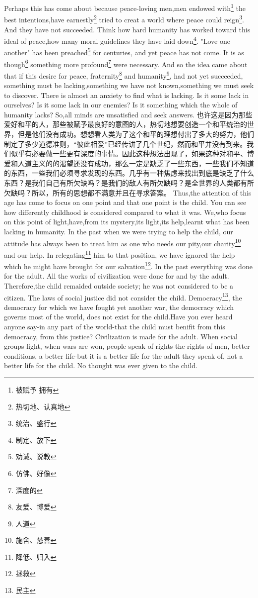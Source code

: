 \documentclass[lang=cn,10pt]{elegantbook}
\begin{document}
Perhaps this has come about because peace-loving men,men endowed with\footnote{被赋予 拥有} the best intentions,have earnestly\footnote{热切地、认真地} tried to creat a world where peace could reign\footnote{统治、盛行}. And they have not succeeded. Think how hard humanity has worked toward this ideal of peace,how many moral guidelines they have laid down\footnote{制定、放下}. "Love one another" has been preached\footnote{劝诫、说教} for centuries, and yet peace has not come. It is as though\footnote{仿佛、好像} something more profound\footnote{深度的} were necessary. And so the idea came about that if this desire for peace, fraternity\footnote{友爱、博爱} and humanity\footnote{人道}, had not yet succeeded, something must be lacking,something we have not known,something we must seek to discover. There is almost an anxiety to find what is lacking. Is it some lack in ourselves? Is it some lack in our enemies? Is it something which the whole of humanity lacks? So,all minds are unsatisfied and seek answers.
也许这是因为那些爱好和平的人，那些被赋予最良好的意图的人，热切地想要创造一个和平统治的世界，但是他们没有成功。想想看人类为了这个和平的理想付出了多大的努力，他们制定了多少道德准则，“彼此相爱”已经传讲了几个世纪，然而和平并没有到来。我们似乎有必要做一些更有深度的事情。因此这种想法出现了，如果这种对和平、博爱和人道主义的的渴望还没有成功，那么一定是缺乏了一些东西，一些我们不知道的东西，一些我们必须寻求发现的东西。几乎有一种焦虑来找出到底是缺乏了什么东西？是我们自己有所欠缺吗？是我们的敌人有所欠缺吗？是全世界的人类都有所欠缺吗？所以，所有的思想都不满意并且在寻求答案。
Thus,the attention of this age has come to focus on one point and that one point is the child. You can see how differently childhood is considered compared to what it was. We,who focus on this point of light,have,from its mystery,its light,its help,learnt what has been lacking in humanity. In the past when we were trying to help the child, our attitude has always been to treat him as one who needs our pity,our charity\footnote{施舍、慈善} and our help. In relegating\footnote{降低、归入} him to that position, we have ignored the help which he might have brought for our salvation\footnote{拯救}. In the past everything was done for the adult. All the works of civilization were done for and by the adult. Therefore,the child remaided outside society; he was not considered to be a citizen. The laws of social justice did not consider the child. Democracy\footnote{民主}, the democracy for which we have fought yet another war, the democracy which governs most of the world, does not exist for the child.Have you ever heard anyone say-in any part of the world-that the child must benifit from this democracy, from this justice? Civilization is made for the adult. When social groups fight, when wars are won, people speak of rights-the rights of men, better conditions, a better life-but it is a better life for the adult they speak of, not a better life for the child. No thought was ever given to the child.
\end{document}
